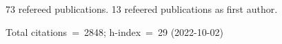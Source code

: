 73 refereed publications. 13 refeered publications as first author.

Total citations~=~2848; h-index~=~29 (2022-10-02)